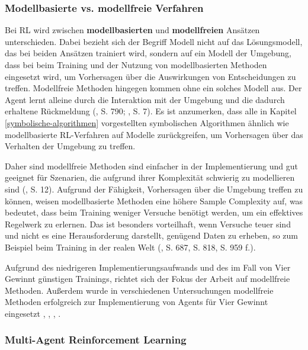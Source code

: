 \subsubsection{Modellbasierte vs. modellfreie Verfahren}

Bei RL wird zwischen \textbf{modellbasierten} und \textbf{modellfreien} Ansätzen unterschieden. Dabei bezieht sich der Begriff \glqq Modell\grqq{} nicht auf das Lösungsmodell, das bei beiden Ansätzen trainiert wird, sondern auf ein Modell der Umgebung, dass bei beim Training und der Nutzung von modellbasierten Methoden eingesetzt wird, um Vorhersagen über die Auswirkungen von Entscheidungen zu treffen. Modellfreie Methoden hingegen kommen ohne ein solches Modell aus. Der Agent lernt alleine durch die Interaktion mit der Umgebung und die dadurch erhaltene Rückmeldung (\cite{Russell.2020}, S. 790; \cite{Sutton.2018}, S. 7). Es ist anzumerken, dass alle in Kapitel \ref{symbolische-algorithmen} vorgestellten symbolischen Algorithmen ähnlich wie modellbasierte RL-Verfahren auf Modelle zurückgreifen, um Vorhersagen über das Verhalten der Umgebung zu treffen.

Daher sind modellfreie Methoden sind einfacher in der Implementierung und gut geeignet für Szenarien, die aufgrund ihrer Komplexität schwierig zu modellieren sind (\cite{Sutton.2018}, S. 12). Aufgrund der Fähigkeit, Vorhersagen über die Umgebung treffen zu können, weisen modellbasierte Methoden eine höhere Sample Complexity auf, was bedeutet, dass beim Training weniger Versuche benötigt werden, um ein effektives Regelwerk zu erlernen. Das ist besonders vorteilhaft, wenn Versuche teuer sind und nicht es eine Herausforderung darstellt, genügend Daten zu erheben, so zum Beispiel beim Training in der realen Welt (\cite{Russell.2020}, S. 687, S. 818, S. 959 f.).

Aufgrund des niedrigeren Implementierungsaufwands und des im Fall von Vier Gewinnt günstigen Trainings, richtet sich der Fokus der Arbeit auf modellfreie Methoden. Außerdem wurde in verschiedenen Untersuchungen modellfreie Methoden erfolgreich zur Implementierung von Agents für Vier Gewinnt eingesetzt \cite{Alderton.2019}, \cite{Taylor.2024}, \cite{Dabas.2022}, \cite{Wäldchen.2022}.

\subsubsection{Multi-Agent Reinforcement Learning}

